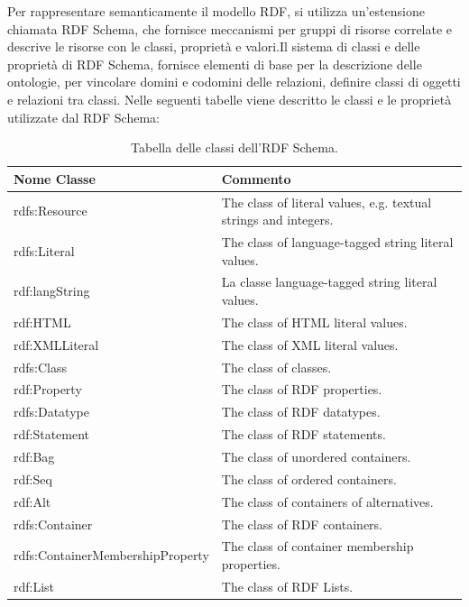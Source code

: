 \documentclass[a4paper,11pt]{article}
\begin{document}
Per rappresentare semanticamente il modello RDF, si utilizza un'estensione chiamata RDF Schema, che fornisce meccanismi per gruppi di risorse correlate e descrive le risorse con le classi, proprietà e valori.\newline Il sistema di classi e delle proprietà di RDF Schema, fornisce elementi di base per la descrizione delle ontologie, per vincolare domini e codomini delle relazioni, definire classi di oggetti e relazioni tra classi.
Nelle seguenti tabelle viene descritto le classi e le proprietà utilizzate dal RDF Schema:	\newline		
\begin{table}[!htb]
\begin{center}				
\begin{tabular}{|>{\small}l|>{\small}l|}
	\hline
	\textbf{Nome Classe} & \textbf{Commento}\\				
	\hline 	rdfs:Resource & The class of literal values, e.g. textual strings and integers.\\	
	\hline rdfs:Literal & 	The class of language-tagged string literal values.\\ 			\hline rdf:langString & La classe  language-tagged string literal values.\\			\hline rdf:HTML &	The class of HTML literal values.\\
	\hline rdf:XMLLiteral	& The class of XML literal values.\\
	\hline rdfs:Class & The class of classes.\\
	\hline rdf:Property & The class of RDF properties.\\
	\hline rdfs:Datatype &	The class of RDF datatypes.\\
	\hline rdf:Statement & The class of RDF statements.\\
	\hline rdf:Bag	& The class of unordered containers.\\
	\hline rdf:Seq	& The class of ordered containers.\\
	\hline rdf:Alt	& The class of containers of alternatives.\\
	\hline rdfs:Container & The class of RDF containers.\\
	\hline rdfs:ContainerMembershipProperty & The class of container membership properties.\\
	\hline rdf:List &	The class of RDF Lists.\\
	\hline			
\end{tabular}	
\caption{Tabella delle classi dell'RDF Schema.}	
\end{center}	
\end{table}
\end{document}
